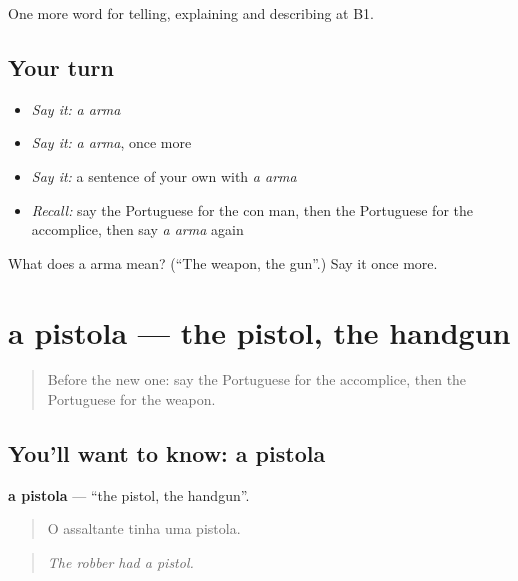 \begin{grammarlens}[title={What you've built}]
One more word for telling, explaining and describing at B1.
\end{grammarlens}

\subsection*{Your turn}
\begin{itemize}
\raggedright
  \item \emph{Say it:} \emph{a arma}
  \item \emph{Say it:} \emph{a arma}, once more
  \item \emph{Say it:} a sentence of your own with \emph{a arma}
  \item \emph{Recall:} say the Portuguese for the con man, then the Portuguese for the accomplice, then say \emph{a arma} again
\end{itemize}

\begin{tcolorbox}[breakable,colback=teal!4,colframe=teal!35!black,title={Before you move on}]
What does a arma mean? (\textquotedblleft{}The weapon, the gun\textquotedblright{}.) Say it once more.
\end{tcolorbox}
\section[a pistola]{a pistola — the pistol, the handgun}

\label{lesson:PT-C290-pistola}



\begin{quote}
Before the new one: say the Portuguese for the accomplice, then the Portuguese for the weapon.
\end{quote}

\subsection*{You'll want to know: a pistola}
\textbf{a pistola} — \textquotedblleft{}the pistol, the handgun\textquotedblright{}.

\begin{quote}
O assaltante tinha uma pistola.
\end{quote}

\begin{quote}
\emph{The robber had a pistol.}
\end{quote}

